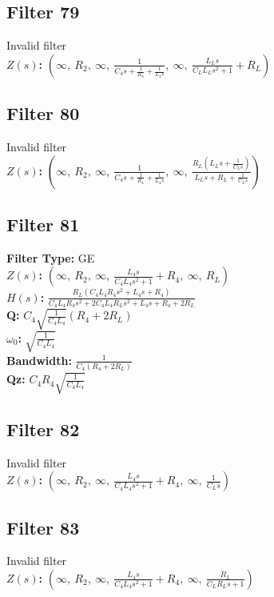 \documentclass{article}
\begin{document}
\subsection*{Filter 79}
Invalid filter \\ 
\textbf{$Z(s)$:} $\left( \infty, \  R_{2}, \  \infty, \  \frac{1}{C_{4} s + \frac{1}{R_{4}} + \frac{1}{L_{4} s}}, \  \infty, \  \frac{L_{L} s}{C_{L} L_{L} s^{2} + 1} + R_{L}\right)$ \\ 
\subsection*{Filter 80}
Invalid filter \\ 
\textbf{$Z(s)$:} $\left( \infty, \  R_{2}, \  \infty, \  \frac{1}{C_{4} s + \frac{1}{R_{4}} + \frac{1}{L_{4} s}}, \  \infty, \  \frac{R_{L} \left(L_{L} s + \frac{1}{C_{L} s}\right)}{L_{L} s + R_{L} + \frac{1}{C_{L} s}}\right)$ \\ 
\subsection*{Filter 81}
\textbf{Filter Type:} GE \\ 
\textbf{$Z(s)$:} $\left( \infty, \  R_{2}, \  \infty, \  \frac{L_{4} s}{C_{4} L_{4} s^{2} + 1} + R_{4}, \  \infty, \  R_{L}\right)$ \\ 
\textbf{$H(s)$:} $\frac{R_{L} \left(C_{4} L_{4} R_{4} s^{2} + L_{4} s + R_{4}\right)}{C_{4} L_{4} R_{4} s^{2} + 2 C_{4} L_{4} R_{L} s^{2} + L_{4} s + R_{4} + 2 R_{L}}$ \\ 
\textbf{Q:} $C_{4} \sqrt{\frac{1}{C_{4} L_{4}}} \left(R_{4} + 2 R_{L}\right)$ \\ 
\textbf{$\omega_0$:} $\sqrt{\frac{1}{C_{4} L_{4}}}$ \\ 
\textbf{Bandwidth:} $\frac{1}{C_{4} \left(R_{4} + 2 R_{L}\right)}$ \\ 
\textbf{Qz:} $C_{4} R_{4} \sqrt{\frac{1}{C_{4} L_{4}}}$ \\ 
\subsection*{Filter 82}
Invalid filter \\ 
\textbf{$Z(s)$:} $\left( \infty, \  R_{2}, \  \infty, \  \frac{L_{4} s}{C_{4} L_{4} s^{2} + 1} + R_{4}, \  \infty, \  \frac{1}{C_{L} s}\right)$ \\ 
\subsection*{Filter 83}
Invalid filter \\ 
\textbf{$Z(s)$:} $\left( \infty, \  R_{2}, \  \infty, \  \frac{L_{4} s}{C_{4} L_{4} s^{2} + 1} + R_{4}, \  \infty, \  \frac{R_{L}}{C_{L} R_{L} s + 1}\right)$ \\ 
\end{document}
